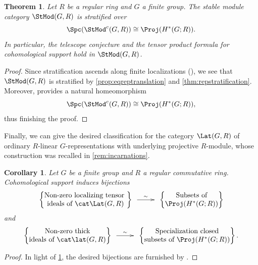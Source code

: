 \documentclass{amsart}%
\numberwithin{equation}{section}%
\newtheorem{Thm}[subsection]{Theorem}
\newtheorem{Cor}[subsection]{Corollary}
\theoremstyle{remark}
\begin{document}
\begin{Thm}\label{thm:stmodstratification}
Let $R$ be a regular ring and $G$ a finite group. The stable module category $\StMod(G,R)$ is stratified over
\[
\Spc(\StMod^c(G,R)) \cong \Proj(H^*(G;R)).
\]
In particular, the telescope conjecture and the tensor product formula for cohomological support hold in $\StMod(G,R)$.  
\end{Thm}
\begin{proof}
Since stratification ascends along finite localizations (\cite[Cor.~5.5]{bhs1}), we see that $\StMod(G,R)$ is stratified by \cref{prop:eqreptranslation} and \cref{thm:repstratification}. Moreover, \cite[Cor.~3.32]{barthel_integral1} provides a natural homeomorphism
\[
\Spc(\StMod^c(G,R)) \cong \Proj(H^*(G;R)),
\]
thus finishing the proof.
\end{proof}

Finally, we can give the desired classification for the category $\Lat(G,R)$ of ordinary $R$-linear $G$-representations with underlying projective $R$-module, whose construction was recalled in \cref{rem:incarnations}. 

\begin{Cor}\label{cor:classicalrepconsequences}
Let $G$ be a finite group and $R$ a regular commutative ring. Cohomological support induces  bijections 
\[
\begin{Bmatrix}
\text{Non-zero localizing tensor } \\
\text{ideals of } \cat \Lat(G,R)
\end{Bmatrix} 
\xymatrix@C=2pc{ \ar[r]^-{\sim} &}
\begin{Bmatrix}
\text{Subsets of}  \\
\Proj(H^*(G;R))
\end{Bmatrix}
\]
and
\[
\begin{Bmatrix}
\text{Non-zero thick} \\
\text{ideals of } \cat \lat(G,R)
\end{Bmatrix} 
\xymatrix@C=2pc{ \ar[r]^-{\sim} &}
\begin{Bmatrix}
\text{Specialization closed}  \\
\text{subsets of } \Proj(H^*(G;R))
\end{Bmatrix}.
\]
\end{Cor}
\begin{proof}
In light of \cref{thm:stmodstratification}, the desired bijections are furnished by \cite[Lem.~6.23 and Rem.~6.25]{barthel_integral1}.
\end{proof}




\end{document}
